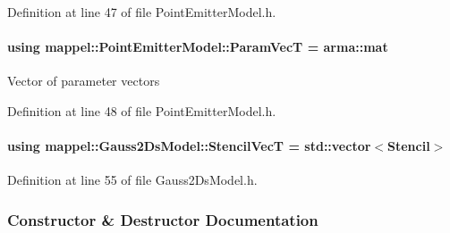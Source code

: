 Definition at line 47 of file Point\+Emitter\+Model.\+h.

\paragraph[{\texorpdfstring{Param\+VecT}{ParamVecT}}]{\setlength{\rightskip}{0pt plus 5cm}using {\bf mappel\+::\+Point\+Emitter\+Model\+::\+Param\+VecT} =  arma\+::mat\hspace{0.3cm}{\ttfamily [inherited]}}\hypertarget{classmappel_1_1PointEmitterModel_add253b568d763f1513a810aac35de719}{}\label{classmappel_1_1PointEmitterModel_add253b568d763f1513a810aac35de719}
Vector of parameter vectors 

Definition at line 48 of file Point\+Emitter\+Model.\+h.

\paragraph[{\texorpdfstring{Stencil\+VecT}{StencilVecT}}]{\setlength{\rightskip}{0pt plus 5cm}using {\bf mappel\+::\+Gauss2\+Ds\+Model\+::\+Stencil\+VecT} =  std\+::vector$<${\bf Stencil}$>$\hspace{0.3cm}{\ttfamily [inherited]}}\hypertarget{classmappel_1_1Gauss2DsModel_ad4e1cca4ec2258c99fe7ca32fff3517a}{}\label{classmappel_1_1Gauss2DsModel_ad4e1cca4ec2258c99fe7ca32fff3517a}


Definition at line 55 of file Gauss2\+Ds\+Model.\+h.



\subsubsection{Constructor \& Destructor Documentation}
